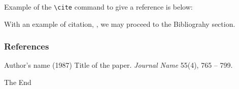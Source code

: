 \documentclass{beamer}
\begin{document}

\begin{frame}[fragile]  %
Example of the \verb|\cite| command to give a reference is below:

With an example of citation, \cite{key1}, we may proceed to the Bibliograhy section.
\end{frame}

\begin{frame}
\frametitle{References}
\footnotesize{
\begin{thebibliography}{99}
  Author's name (1987)
 \newblock Title of the paper.
 \newblock \emph{Journal Name} 55(4), 765 -- 799.
\end{thebibliography}
}
\end{frame}

\begin{frame}
\centerline{The End}
\end{frame}


\end{document}
